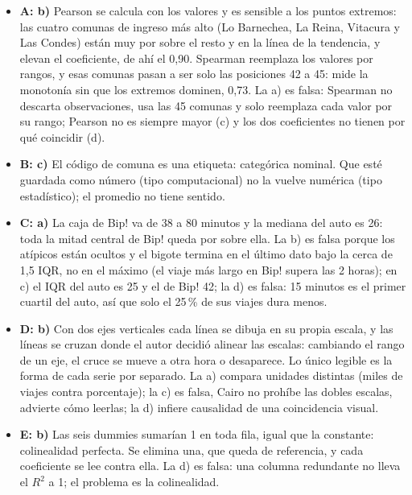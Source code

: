 \documentclass[11pt]{article}
\newcommand{\bloque}[1]{\vspace{6pt}{\bfseries #1}\vspace{2pt}\par}
\begin{document}
\bloque{Justificación de cada pregunta}

\begin{itemize}[itemsep=7pt]
\item \textbf{A: b)} Pearson se calcula con los valores y es sensible a los puntos extremos: las cuatro comunas de ingreso más alto (Lo Barnechea, La Reina, Vitacura y Las Condes) están muy por sobre el resto y en la línea de la tendencia, y elevan el coeficiente, de ahí el 0,90. Spearman reemplaza los valores por rangos, y esas comunas pasan a ser solo las posiciones 42 a 45: mide la monotonía sin que los extremos dominen, 0,73. La a) es falsa: Spearman no descarta observaciones, usa las 45 comunas y solo reemplaza cada valor por su rango; Pearson no es siempre mayor (c) y los dos coeficientes no tienen por qué coincidir (d).

\item \textbf{B: c)} El código de comuna es una etiqueta: categórica nominal. Que esté guardada como número (tipo computacional) no la vuelve numérica (tipo estadístico); el promedio no tiene sentido.

\item \textbf{C: a)} La caja de Bip! va de 38 a 80 minutos y la mediana del auto es 26: toda la mitad central de Bip! queda por sobre ella. La b) es falsa porque los atípicos están ocultos y el bigote termina en el último dato bajo la cerca de 1,5 IQR, no en el máximo (el viaje más largo en Bip! supera las 2 horas); en c) el IQR del auto es 25 y el de Bip! 42; la d) es falsa: 15 minutos es el primer cuartil del auto, así que solo el 25\,\% de sus viajes dura menos.

\item \textbf{D: b)} Con dos ejes verticales cada línea se dibuja en su propia escala, y las líneas se cruzan donde el autor decidió alinear las escalas: cambiando el rango de un eje, el cruce se mueve a otra hora o desaparece. Lo único legible es la forma de cada serie por separado. La a) compara unidades distintas (miles de viajes contra porcentaje); la c) es falsa, Cairo no prohíbe las dobles escalas, advierte cómo leerlas; la d) infiere causalidad de una coincidencia visual.

\item \textbf{E: b)} Las seis dummies sumarían 1 en toda fila, igual que la constante: colinealidad perfecta. Se elimina una, que queda de referencia, y cada coeficiente se lee contra ella. La d) es falsa: una columna redundante no lleva el $R^2$ a 1; el problema es la colinealidad.


\end{itemize}
\end{document}

